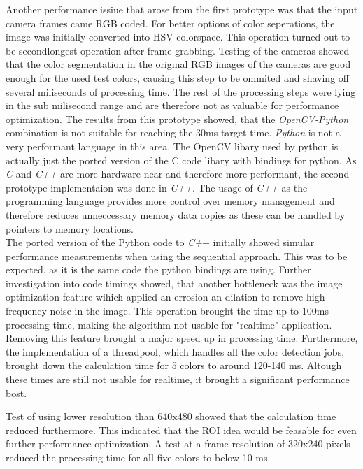 Another performance issiue that arose from the first prototype was that the input camera frames came RGB coded. For better options of color seperations, the image was  initially converted into HSV colorspace. This operation turned out to be secondlongest operation after frame grabbing. Testing of the cameras showed that the color segmentation in the original RGB images of the cameras are good enough for the used test colors, causing this step to be ommited and shaving off several miliseconds of processing time.
The rest of the processing steps were lying in the sub milisecond range and are therefore not as  valuable for performance optimization.
The results from this prototype showed, that the \textit{OpenCV-Python} combination is not suitable for reaching the 30ms target time. \textit{Python} is not a very performant language in this area. The OpenCV libary used by python is actually just the ported version of the C code libary with bindings for python. As \textit{C} and \textit{C++} are more hardware near and therefore more performant, the second prototype implementaion was done in \textit{C++}. The usage of \textit{C++} as the programming language provides more control over memory management and therefore reduces unneccessary memory data copies as these can be handled by pointers to memory locations.\\
The ported version of the Python code to\textit{ C+}+ initially showed simular performance measurements when using the sequential approach. This was to be expected, as it is the same code the python bindings are using. Further investigation into code timings showed, that another bottleneck was the image optimization feature wihich applied an errosion an dilation to remove high frequency noise in the image. This operation brought the time up to 100ms processing time, making the algorithm  not usable for "realtime" application. Removing this feature brought a major speed up in processing time. 
Furthermore, the implementation of a threadpool, which handles all the color detection jobs, brought down the calculation time for 5 colors to around 120-140 ms. Altough these times are still not usable for realtime, it brought a significant performance bost.

Test of using lower resolution than 640x480 showed that the calculation time reduced furthermore. This indicated that the ROI idea would be feasable for even further performance optimization. A test at a frame resolution of 320x240 pixels reduced the processing time for all five colors to below 10 ms.\\

